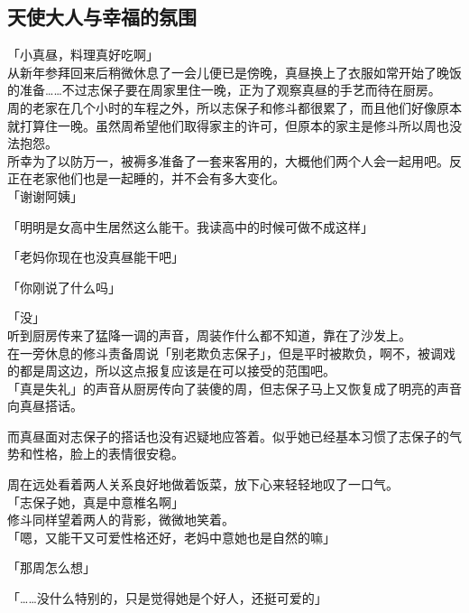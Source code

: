 \subsection{天使大人与幸福的氛围}

「小真昼，料理真好吃啊」\\

从新年参拜回来后稍微休息了一会儿便已是傍晚，真昼换上了衣服如常开始了晚饭的准备……不过志保子要在周家里住一晚，正为了观察真昼的手艺而待在厨房。\\

周的老家在几个小时的车程之外，所以志保子和修斗都很累了，而且他们好像原本就打算住一晚。虽然周希望他们取得家主的许可，但原本的家主是修斗所以周也没法抱怨。\\

所幸为了以防万一，被褥多准备了一套来客用的，大概他们两个人会一起用吧。反正在老家他们也是一起睡的，并不会有多大变化。\\

「谢谢阿姨」

「明明是女高中生居然这么能干。我读高中的时候可做不成这样」

「老妈你现在也没真昼能干吧」

「你刚说了什么吗」

「没」\\

听到厨房传来了猛降一调的声音，周装作什么都不知道，靠在了沙发上。\\

在一旁休息的修斗责备周说「别老欺负志保子」，但是平时被欺负，啊不，被调戏的都是周这边，所以这点报复应该是在可以接受的范围吧。\\

「真是失礼」的声音从厨房传向了装傻的周，但志保子马上又恢复成了明亮的声音向真昼搭话。

而真昼面对志保子的搭话也没有迟疑地应答着。似乎她已经基本习惯了志保子的气势和性格，脸上的表情很安稳。

周在远处看着两人关系良好地做着饭菜，放下心来轻轻地叹了一口气。\\

「志保子她，真是中意椎名啊」\\

修斗同样望着两人的背影，微微地笑着。\\

「嗯，又能干又可爱性格还好，老妈中意她也是自然的嘛」

「那周怎么想」

「……没什么特别的，只是觉得她是个好人，还挺可爱的」

